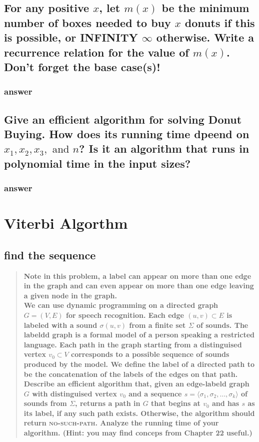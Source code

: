\documentclass[titlepage]{article}\usepackage[]{graphicx}\usepackage[]{color}
\begin{document}
\subsection{For any positive $x$, let $m(x)$ be the minimum number of boxes
  needed to buy $x$ donuts if this is possible, or INFINITY $\infty$
  otherwise. Write a recurrence relation for the value of $m(x)$. Don't forget
the base case(s)!}

\subsubsection{answer}



\subsection{ Give an efficient algorithm for solving Donut Buying. How does its
  running time dpeend on $x_1, x_2, x_3,\text{ and } n$? Is it an algorithm
that runs in polynomial time in the input sizes?} 

\subsubsection{answer}




\section{Viterbi Algorthm}
	\subsection{find the sequence}
\begin{quote}
	\textbf{Note in this problem, a label can appear on more than one edge in the graph
		and can even appear on more than one edge leaving a given node in the graph.
		\\
		We can use dynamic programming on a directed graph $G = (V,E)$ for speech
		recognition. Each edge $(u,v) \subset E$ is labeled with a sound
		$\sigma(u,v)$ from a finite set $\Sigma$ of sounds. The labeldd graph is a
		formal model of a person speaking a restricted language. Each path in the graph
		starting from a distinguised vertex $v_0 \subset V$ corresponds to a possible
		sequence of sounds produced by the model. We define the label of a directed
		path to be the concatenation of the labels of the edges on that path. 
		Describe an efficient algorithm that, given an edge-labeld graph
		$G$ with distinguised vertex $v_0$ and a sequence $s = \langle \sigma_1,
		\sigma_2, \dots, \sigma_k \rangle$ of sounds from $\Sigma$, returns a path in
		$G$ that begins at $v_0$ and has $s$ as its label, if any such path exists.
		Otherwise, the algorithm should return \textsc{no-such-path}. Analyze the
		running time of your algorithm. (Hint: you may find conceps from Chapter 22
	useful.)}
\end{quote}
\end{document}
